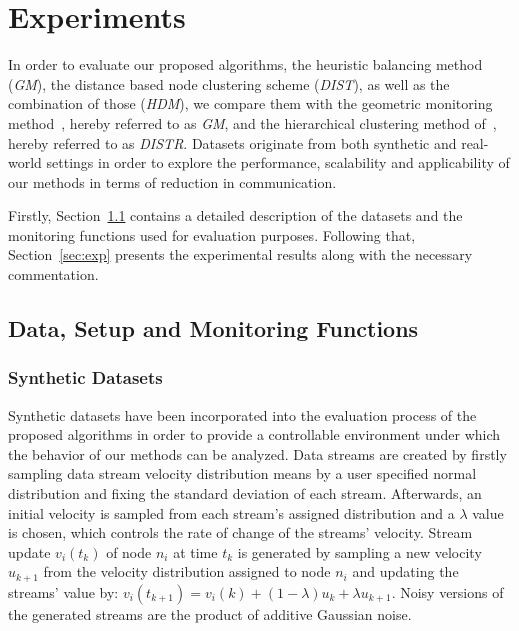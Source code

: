 \chapter{Experiments} \label{chap:exp}

In order to evaluate our proposed algorithms, the heuristic balancing method (\emph{GM}), the distance based node clustering scheme (\emph{DIST}), as well as the combination of those (\emph{HDM}), we compare them with the geometric monitoring method~\cite{Sharfman2006GM}, hereby referred to as \emph{GM}, and the hierarchical clustering method of~\cite{Keren2014GMHetStreams}, hereby referred to as \emph{DISTR}. Datasets originate from both synthetic and real-world settings in order to explore the performance, scalability and applicability of our methods in terms of reduction in communication.

Firstly, Section~\ref{sec:datasets} contains a detailed description of the datasets and the monitoring functions used for evaluation purposes. Following that, Section~\ref{sec:exp} presents the experimental results along with the necessary commentation.

\section{Data, Setup and Monitoring Functions} \label{sec:datasets}

\subsection{Synthetic Datasets}

Synthetic datasets have been incorporated into the evaluation process of the proposed algorithms in order to provide a controllable environment under which the behavior of our methods can be analyzed. Data streams are created by firstly sampling data stream velocity distribution means by a user specified normal distribution and fixing the standard deviation of each stream. Afterwards, an initial velocity is sampled from each stream's assigned distribution and a $\lambda$ value is chosen, which controls the rate of change of the streams' velocity. Stream update $v_i(t_k)$ of node $n_i$ at time $t_k$ is generated by sampling a new velocity $u_{k+1}$ from the velocity distribution assigned to node $n_i$ and updating the streams' value by: $v_i(t_{k+1})=v_i(k) + (1-\lambda)u_{k} + \lambda u_{k+1}$. Noisy versions of the generated streams are the product of additive Gaussian noise.

